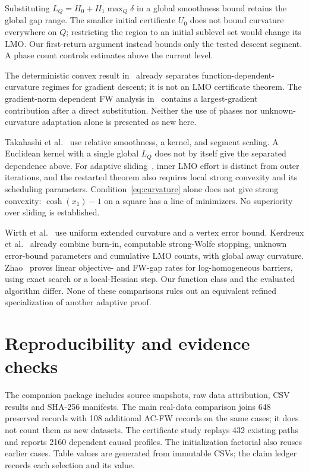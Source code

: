 Substituting $L_Q=H_0+H_1\max_Q\delta$ in a global smoothness bound
retains the global gap range. The smaller initial certificate $U_0$
does not bound curvature everywhere on $Q$; restricting the region
to an initial sublevel set would change its LMO.
Our first-return argument instead bounds only the tested descent
segment. A phase count controls estimates above the current level.

The deterministic convex result in~\cite[Appendix C.4]{lobanovkoloskova}
already separates function-dependent-curvature regimes for gradient
descent; it is not an LMO certificate theorem.
The gradient-norm dependent FW analysis in~\cite[Theorem 5.1]{vyguzov}
contains a largest-gradient contribution after a direct substitution.
Neither the use of phases nor unknown-curvature adaptation alone
is presented as new here.

Takahashi et al.~\cite{bregmanfw} use relative smoothness, a kernel,
and segment scaling. A Euclidean kernel with a single global $L_Q$
does not by itself give the separated dependence above.
For adaptive sliding~\cite[Theorems 2.1 and 4.1]{adcgs}, inner LMO
effort is distinct from outer iterations, and the restarted theorem
also requires local strong convexity and its scheduling parameters.
Condition~\eqref{eq:curvature} alone does not give strong convexity:
$\cosh(x_1)-1$ on a square has a line of minimizers.
No superiority over sliding is established.

Wirth et al.~\cite[Definition 2.3(b), Theorem 3.6]{wirth} use uniform
extended curvature and a vertex error bound. Kerdreux et
al.~\cite[Proposition 4.2, Theorem 5.1]{restartfw} already combine
burn-in, computable strong-Wolfe stopping, unknown error-bound
parameters and cumulative LMO counts, with global away curvature.
Zhao~\cite[Theorems 4.1--4.2]{zhao} proves linear objective- and
FW-gap rates for log-homogeneous barriers, using exact search or a
local-Hessian step. Our function class and the evaluated algorithm
differ. None of these comparisons rules out an equivalent refined
specialization of another adaptive proof.

\section{Reproducibility and evidence checks}
\label{app:reproduction}
The companion package includes source snapshots, raw data attribution,
CSV results and SHA-256 manifests. The main real-data comparison
joins 648 preserved records with 108 additional AC-FW records on the
same cases; it does not count them as new datasets.
The certificate study replays 432 existing paths and reports 2160
dependent causal profiles. The initialization factorial also reuses
earlier cases. Table values are generated from immutable CSVs; the
claim ledger records each selection and its value.

